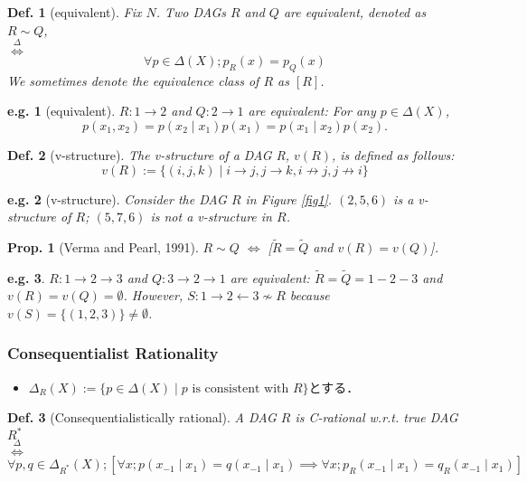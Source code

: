 \documentclass[11pt,a4paper,dvipdfmx]{article}
\theoremstyle{plain}
\newtheorem{prop}{Prop.}[section]
\newtheorem{df}{Def.}[section]
\newtheorem{eg}{e.g.}[section]
\renewcommand{\tilde}{\widetilde}
\newcommand{\defi}{\stackrel{\Delta}{\Longleftrightarrow}}
\newcommand{\equi}{\Longleftrightarrow}
\begin{document}
\begin{df}[equivalent] Fix $N$.
	Two DAGs $R$ and $Q$ are equivalent, denoted as $R \sim Q$, \\
	$\defi$
	$$\forall p \in \Delta(X); p_R(x) = p_Q(x)$$
	We sometimes denote the equivalence class of $R$ as $[R]$.
\end{df}

\begin{eg}[equivalent]
	$R:1 \to 2$ and $Q:2 \to 1$ are equivalent: For any $p \in \Delta(X)$, 
	$$p(x_1, x_2) = p(x_2 \mid x_1) p(x_1) = p(x_1 \mid x_2) p(x_2).$$
\end{eg}

\begin{df}[v-structure] The v-structure of a DAG R, $v(R)$, is defined as follows:
	\[
	v(R) := \{(i,j,k) \mid i \to j, j \to k, i \nrightarrow j, j \nrightarrow i \}
	\]
\end{df}
\begin{eg}[v-structure]
	Consider the DAG $R$ in Figure \ref{fig1}. $(2,5,6)$ is a v-structure of $R$; $(5,7,6)$ is not a v-structure in $R$.
\end{eg}

\begin{prop}[Verma and Pearl, 1991] \label{prop_vp}
	$R \sim Q$ $\equi$ [$\tilde{R} = \tilde{Q}$ and $v(R) = v(Q)$].
\end{prop}
\begin{eg}
	$R:1 \to 2 \to 3$ and $Q:3 \to 2 \to 1$ are equivalent: $\tilde{R} = \tilde{Q} = 1-2-3$ and $v(R) = v(Q) = \emptyset$. However, $S: 1 \to 2 \leftarrow 3 \nsim R$ because $v(S) = \{(1,2,3)\} \neq \emptyset$.
\end{eg}

\subsubsection{Consequentialist Rationality}
\begin{itemize}
	\item $\Delta_R(X) := \{p \in \Delta(X) \mid p \text{ is consistent with } R\}$とする．
\end{itemize}
\begin{screen}
\begin{df}[Consequentialistically rational]
	A DAG $R$ is C-rational w.r.t. true DAG $R^*$ \\
	$\defi$
	\[
	\forall p, q \in \Delta_{R^*}(X);
	\left[
	\forall x; p(x_{-1} \mid x_1) = q(x_{-1} \mid x_1) \implies 
	\forall x; p_R(x_{-1} \mid x_1) = q_R(x_{-1} \mid x_1)
	\right]
	\]
\end{df}
\end{screen}
\end{document}
